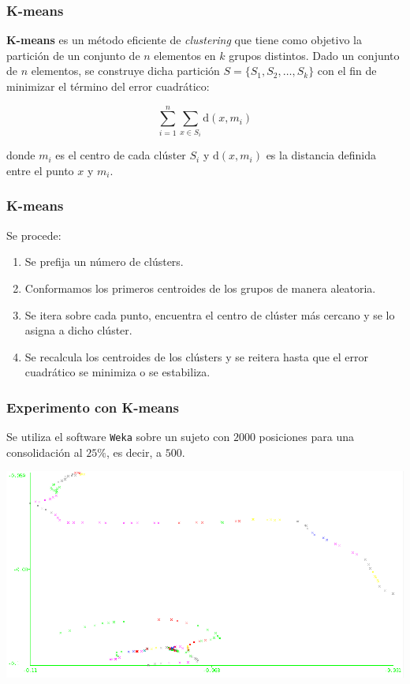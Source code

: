 \documentclass[10pt, spanish]{beamer}
\begin{document}
\begin{frame}[fragile]
\frametitle{K-means}
\textbf{K-means} es un m\'etodo eficiente de \textit{clustering} que tiene como objetivo la partici\'on de un conjunto de $n$ elementos en $k$ grupos distintos. Dado un conjunto de $n$ elementos, se construye dicha partici\'on $S=\{S_1, S_2, \ldots, S_k\}$ con el fin de minimizar el t\'ermino del error cuadr\'atico:

$$ \sum_{i=1}^{n} \sum_{x\in S_i} \text{d}(x,m_i)$$

donde $m_i$ es el centro de cada cl\'uster $S_i$ y $\text{d}(x, m_i)$ es la distancia definida entre el punto $x$ y $m_i$.

\end{frame}

\begin{frame}[fragile]
\frametitle{K-means}
Se procede:
\begin{enumerate}
	\item Se prefija un n\'umero de cl\'usters.
	\item Conformamos los primeros centroides de los grupos de manera aleatoria.
	\item Se itera sobre cada punto, encuentra el centro de cl\'uster m\'as cercano y se lo asigna a dicho cl\'uster.
	\item Se recalcula los centroides de los cl\'usters y se reitera hasta que el error cuadr\'atico se minimiza o se estabiliza.
\end{enumerate}
\end{frame}

\begin{frame}[fragile]
\frametitle{Experimento con K-means}
Se utiliza el software \texttt{Weka} sobre un sujeto con $2000$ posiciones para una consolidaci\'on al $25\%$, es decir, a $500$.

\begin{center}
	\includegraphics[scale=.43]{kMeansSujeto1.png}
\end{center}


\end{frame}
\end{document}
